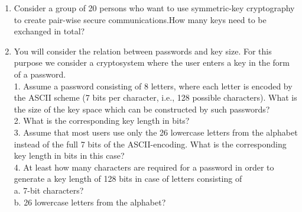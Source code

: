 \documentclass[12pt,oneside,oldfontcommands]{memoir}
\begin{document}
  \begin{enumerate}[label=(\alph*)]
    \item Consider a group of 20 persons who want to use symmetric-key cryptography to create pair-wise secure communications.How many keys need to be exchanged in total?
    \item You will consider the relation between passwords and key size. For this purpose
    we consider a cryptosystem where the user enters a key in the form of a password.\\
    1. Assume a password consisting of 8 letters, where each letter is encoded by the
    ASCII scheme (7 bits per character, i.e., 128 possible characters). What is the
    size of the key space which can be constructed by such passwords?\\
    2. What is the corresponding key length in bits?\\
    3. Assume that most users use only the 26 lowercase letters from the alphabet instead of the full 7 bits of the ASCII-encoding. What is the corresponding key length in bits in this case?\\
    4. At least how many characters are required for a password in order to generate a
    key length of 128 bits in case of letters consisting of\\
    a. 7-bit characters?\\
    b. 26 lowercase letters from the alphabet?
  \end{enumerate}

\end{document}
